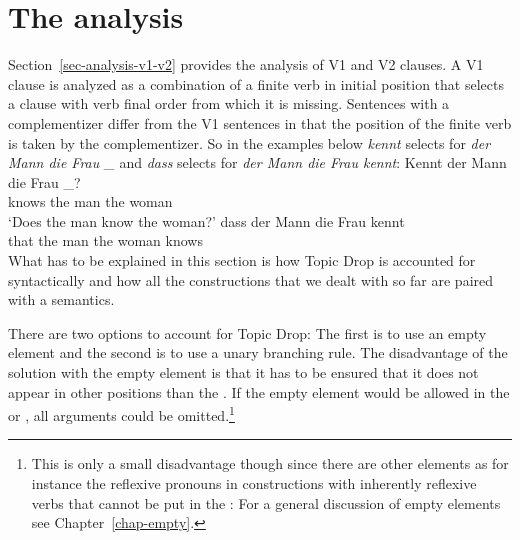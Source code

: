 \section{The analysis}

Section~\ref{sec-analysis-v1-v2} provides the analysis of V1 and V2 clauses. A V1 clause is analyzed
as a combination of a finite verb in initial position that selects a clause with verb final order
from which it is missing. Sentences with a complementizer differ from the V1 sentences in that the
position of the finite verb is taken by the complementizer. So in the examples below \emph{kennt}
selects for \emph{der Mann die Frau \_} and \emph{dass} selects for \emph{der Mann die Frau kennt}:
\eal
\ex 
\gll Kennt der Mann die Frau \_?\\
     knows the man the woman\\
\glt `Does the man know the woman?'
\ex
\gll dass der Mann die Frau kennt\\
     that the man the woman knows\\
\zl
What has to be explained in this section is how Topic Drop is accounted for syntactically and how
all the constructions that we dealt with so far are paired with a semantics.

There are two options to account for Topic Drop: The first is to use an empty element \citet{Huang84} and the
second is to use a unary branching rule. The disadvantage of the solution with the empty element
is that it has to be ensured that it does not appear in other positions than the \vf. If the empty
element would be allowed in the \mf or \nf, all arguments could be omitted.\footnote{
This is only a small
disadvantage though since there are other elements as for instance the reflexive pronouns in
constructions with inherently reflexive verbs that cannot be put in the \vf:
\eal
{}
\zl
For a general discussion of empty elements see Chapter~\ref{chap-empty}.
}


